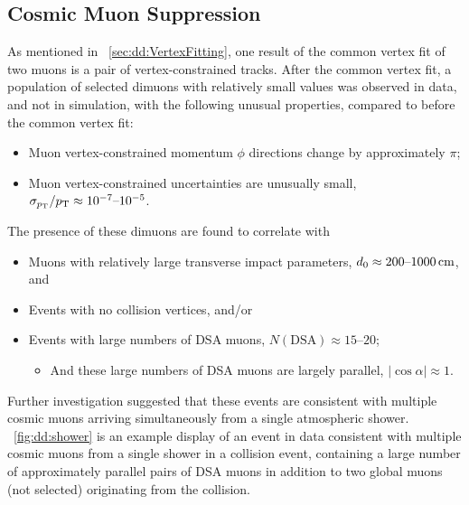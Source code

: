 \subsection{Cosmic Muon Suppression}
\label{sec:dd:CosmicCuts}
As mentioned in \Sec~\ref{sec:dd:VertexFitting}, one result of the common vertex fit of two muons is a pair of vertex-constrained tracks.
After the common vertex fit, a population of selected dimuons with relatively small \vchisq values was observed in data, and not in simulation, with the following unusual properties, compared to before the common vertex fit:
\begin{itemize}
  \item Muon vertex-constrained momentum $\phi$ directions change by approximately $\pi$;
  \item Muon vertex-constrained \pT uncertainties are unusually small, \ie $\sigma_{p_{\mathrm{T}}}/p_{\mathrm{T}} \approx 10^{-7}\text{--}10^{-5}$.
\end{itemize}
The presence of these dimuons are found to correlate with
\begin{itemize}
  \item Muons with relatively large transverse impact parameters, \ie $d_0 \approx 200\text{--}1000\,\text{cm}$, and
  \item Events with no \pp collision vertices, and/or
  \item Events with large numbers of DSA muons, \ie $N(\text{DSA}) \approx 15\text{--}20$;
    \begin{itemize}
      \item And these large numbers of DSA muons are largely parallel, \ie $|\cos{\alpha}| \approx 1$.
    \end{itemize}
\end{itemize}
Further investigation suggested that these events are consistent with multiple cosmic muons arriving simultaneously from a single atmospheric shower.
\Fig~\ref{fig:dd:shower} is an example display of an event in data consistent with multiple cosmic muons from a single shower in a \pp collision event, containing a large number of approximately parallel pairs of DSA muons in addition to two global muons (not selected) originating from the \pp collision.

